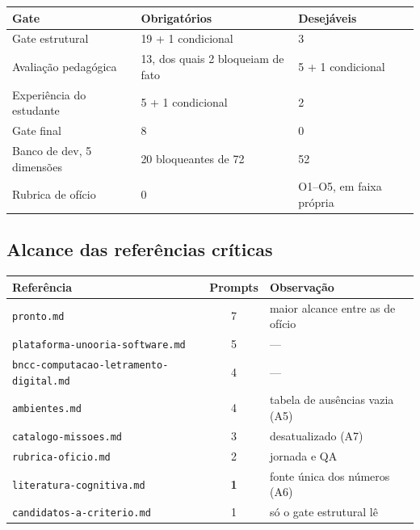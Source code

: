 \documentclass[11pt,a4paper]{article}
\begin{document}
\begin{center}
\begin{tabular}{@{}l l l@{}}
\toprule
\textbf{Gate} & \textbf{Obrigat\'orios} & \textbf{Desej\'aveis} \\
\midrule
Gate estrutural & 19 + 1 condicional & 3 \\
Avalia\c{c}\~ao pedag\'ogica & 13, dos quais 2 bloqueiam de fato & 5 + 1 condicional \\
Experi\^encia do estudante & 5 + 1 condicional & 2 \\
Gate final & 8 & 0 \\
Banco de dev, 5 dimens\~oes & 20 bloqueantes de 72 & 52 \\
Rubrica de of\'icio & 0 & O1--O5, em faixa pr\'opria \\
\bottomrule
\end{tabular}
\end{center}

\subsection{Alcance das refer\^encias cr\'iticas}

\begin{center}
\begin{tabular}{@{}l c l@{}}
\toprule
\textbf{Refer\^encia} & \textbf{Prompts} & \textbf{Observa\c{c}\~ao} \\
\midrule
\texttt{pronto.md} & 7 & maior alcance entre as de of\'icio \\
\texttt{plataforma-unooria-software.md} & 5 & --- \\
\texttt{bncc-computacao-letramento-digital.md} & 4 & --- \\
\texttt{ambientes.md} & 4 & tabela de aus\^encias vazia (A5) \\
\texttt{catalogo-missoes.md} & 3 & desatualizado (A7) \\
\texttt{rubrica-oficio.md} & 2 & jornada e QA \\
\texttt{literatura-cognitiva.md} & \textbf{1} & fonte \'unica dos n\'umeros (A6) \\
\texttt{candidatos-a-criterio.md} & 1 & s\'o o gate estrutural l\^e \\
\bottomrule
\end{tabular}
\end{center}
\end{document}
